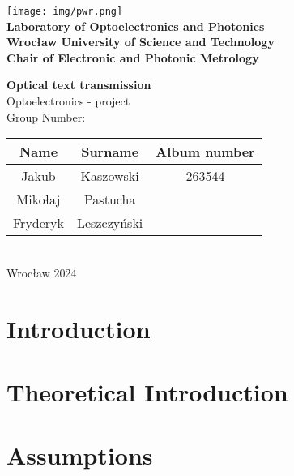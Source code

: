 \documentclass[12pt]{article}
\def\thetitle{Optical text transmission}
\begin{document}
	\begin{titlepage}
		\begin{center}
			\texttt{[image: img/pwr.png]}\\
			\vspace{20pt}
			\textbf{Laboratory of Optoelectronics and Photonics} \\
			\textbf{Wrocław University of Science and Technology} \\
			\textbf{Chair of Electronic and Photonic Metrology}
			
			\vspace{20pt}
		
		\textbf{\huge\thetitle} \\
		\vspace{5pt}
		\Large Optoelectronics - project \\
		\vspace{20pt}
		\normalsize
		Group Number: \\
		
		\begin{tabular}{ |c|c|c| } 
			\hline
			Name & Surname & Album number \\ \hline
			Jakub & Kaszowski & 263544 \\ \hline
			Mikołaj & Pastucha & \\ \hline
			Fryderyk & Leszczyński & \\
			\hline
		\end{tabular} \\
		\vspace{5pt}
		Wrocław 2024 \\
		
		
			
		\end{center}
		
	\end{titlepage}	

	\tableofcontents
	\newpage
	
	\section{Introduction}
	
	\section{Theoretical Introduction}
	
	\section{Assumptions}
\end{document}
